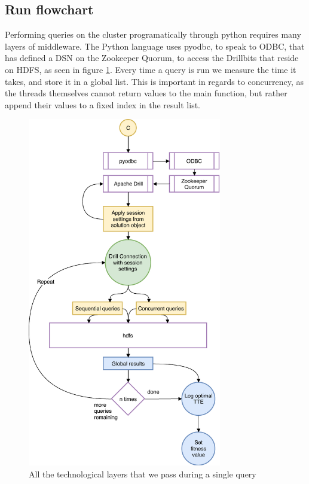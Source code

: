 \documentclass[a4paper,english]{report}
\begin{document}
			\subsection{Run flowchart}
				\label{sec:runs}
				Performing queries on the cluster programatically through python requires many layers of middleware. The Python language uses pyodbc, to speak to ODBC, that has defined a DSN on the Zookeeper Quorum, to access the Drillbits that reside on HDFS, as seen in figure \ref{fig:run_workflow}. Every time a query is run we measure the time it takes, and store it in a global list. This is important in regards to concurrency, as the threads themselves cannot return values to the main function, but rather append their values to a fixed index in the result list.
				\begin{figure}[H]
					\centering
					\includegraphics[width=240pt]{run_workflow}
					\caption{All the technological layers that we pass during a single query}
					\label{fig:run_workflow}
				\end{figure}
			\clearpage
\end{document}
